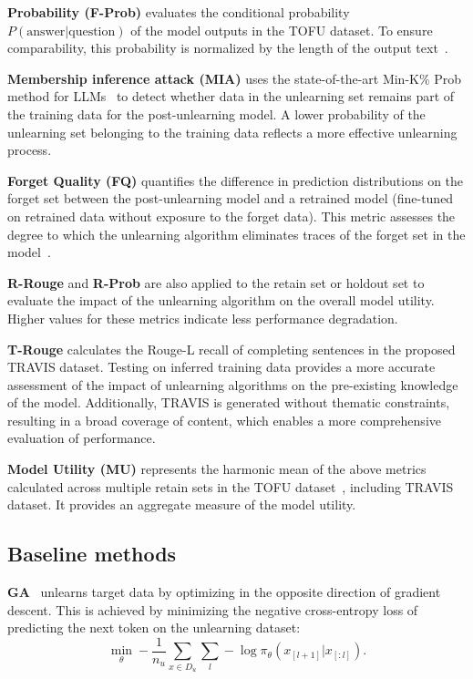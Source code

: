 \documentclass{article}
\theoremstyle{plain}
\theoremstyle{definition}
\theoremstyle{remark}
\begin{document}
\textbf{Probability (F-Prob)} evaluates the conditional probability $P(\text{answer}|\text{question})$ of the model outputs in the TOFU dataset. To ensure comparability, this probability is normalized by the length of the output text~\cite{DBLP:journals/corr/abs-2401-06121}.

\textbf{Membership inference attack (MIA)} uses the state-of-the-art Min-K\% Prob method for LLMs~\cite{DBLP:conf/iclr/ShiAXHLB0Z24} to detect whether data in the unlearning set remains part of the training data for the post-unlearning model. A lower probability of the unlearning set belonging to the training data reflects a more effective unlearning process.

\textbf{Forget Quality (FQ)} quantifies the difference in prediction distributions on the forget set between the post-unlearning model and a retrained model (fine-tuned on retrained data without exposure to the forget data). This metric assesses the degree to which the unlearning algorithm eliminates traces of the forget set in the model~\cite{DBLP:journals/corr/abs-2401-06121}.

\textbf{R-Rouge} and \textbf{R-Prob} are also applied to the retain set or holdout set to evaluate the impact of the unlearning algorithm on the overall model utility. Higher values for these metrics indicate less performance degradation.

\textbf{T-Rouge} calculates the Rouge-L recall of completing sentences in the proposed TRAVIS dataset. Testing on inferred  training data provides a more accurate assessment of the impact of unlearning algorithms on the pre-existing knowledge of the model. Additionally, TRAVIS is generated without thematic constraints, resulting in a broad coverage of content, which enables a more comprehensive evaluation of performance.

\textbf{Model Utility (MU)} represents the harmonic mean of the above metrics calculated across multiple retain sets in the TOFU dataset~\cite{DBLP:journals/corr/abs-2401-06121}, including TRAVIS dataset. It provides an aggregate measure of the model utility.

\subsection{Baseline methods}
\textbf{GA}~\cite{DBLP:journals/corr/abs-2310-10683} unlearns target data by optimizing in the opposite direction of gradient descent. This is achieved by minimizing the negative cross-entropy loss of predicting the next token on the unlearning dataset:
\begin{equation}
	\min_{\theta} -\frac{1}{n_u}\sum_{x\in D_u}\sum_{l}-\log{\pi_{\theta}(x_{[l+1]}|x_{[:l]})}.
\end{equation}
\end{document}
